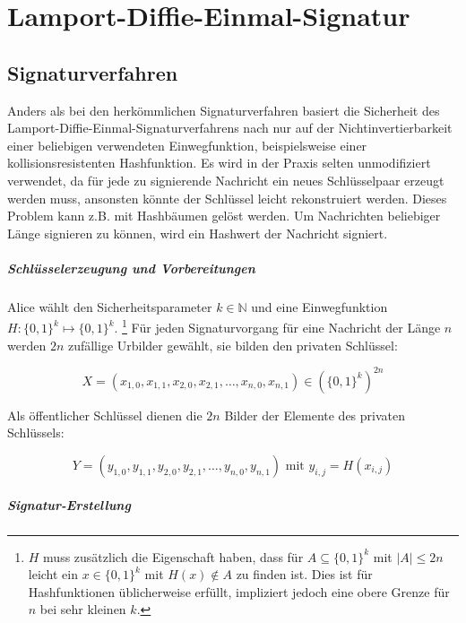 \documentclass[a4paper,12pt,oneside]{scrreprt}
\begin{document}
\chapter{Lamport-Diffie-Einmal-Signatur}

\section{Signaturverfahren}

Anders als bei den herkömmlichen Signaturverfahren basiert die Sicherheit des Lamport-Diffie-Einmal-Signaturverfahrens nach \cite{LampoCDSFA79_138} nur auf der Nichtinvertierbarkeit einer beliebigen verwendeten Einwegfunktion, beispielsweise einer kollisionsresistenten Hashfunktion. Es wird in der Praxis selten unmodifiziert verwendet, da für jede zu signierende Nachricht ein neues Schlüsselpaar erzeugt werden muss, ansonsten könnte der Schlüssel leicht rekonstruiert werden. Dieses Problem kann z.B. mit Hashbäumen gelöst werden. Um Nachrichten beliebiger Länge signieren zu können, wird ein Hashwert der Nachricht signiert. 

\paragraph{Schlüsselerzeugung und Vorbereitungen}

Alice wählt den Sicherheitsparameter $k \in \mathbb{N}$ und eine Einwegfunktion $H : \{0,1\}^k \mapsto \{0,1\}^k$. \footnote{$H$ muss zusätzlich die Eigenschaft haben, dass für $A \subseteq \{0,1\}^k$ mit $|A| \leq 2n$ leicht ein $x \in \{0,1\}^k$ mit $H(x) \notin A$ zu finden ist. Dies ist für Hashfunktionen üblicherweise erfüllt, impliziert jedoch eine obere Grenze für $n$ bei sehr kleinen $k$. } Für jeden Signaturvorgang für eine Nachricht der Länge $n$ werden $2n$ zufällige Urbilder gewählt, sie bilden den privaten Schlüssel:

\[ X = (x_{1,0},x_{1,1},x_{2,0},x_{2,1},\dots,x_{n,0},x_{n,1}) \in (\{0,1\}^k)^{2n}\]

Als öffentlicher Schlüssel dienen die $2n$ Bilder der Elemente des privaten Schlüssels:

\[ Y = (y_{1,0},y_{1,1},y_{2,0},y_{2,1},\dots,y_{n,0},y_{n,1}) \text{ mit } y_{i,j} = H(x_{i,j})\]

\paragraph{Signatur-Erstellung}
\end{document}
